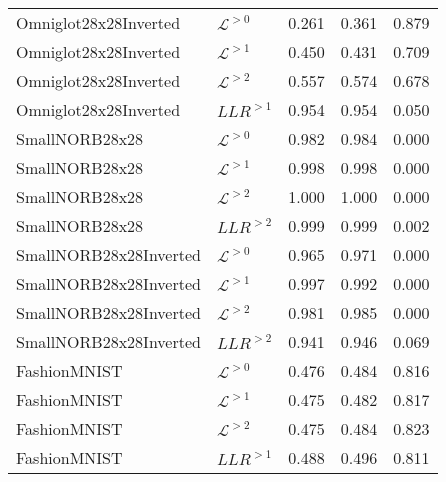 {\begin{table}[t]
\begin{tabular}{llrrr}
\midrule
Omniglot28x28Inverted    &  $\mathcal{L}^{>0}$    &  0.261  &  0.361  &  0.879 \\
Omniglot28x28Inverted    &  $\mathcal{L}^{>1}$    &  0.450  &  0.431  &  0.709 \\
Omniglot28x28Inverted    &  $\mathcal{L}^{>2}$    &  0.557  &  0.574  &  0.678 \\
Omniglot28x28Inverted    &  $LLR^{>1}$            &  0.954  &  0.954  &  0.050 \\
\midrule
SmallNORB28x28           &  $\mathcal{L}^{>0}$    &  0.982  &  0.984  &  0.000 \\
SmallNORB28x28           &  $\mathcal{L}^{>1}$    &  0.998  &  0.998  &  0.000 \\
SmallNORB28x28           &  $\mathcal{L}^{>2}$    &  1.000  &  1.000  &  0.000 \\
SmallNORB28x28           &  $LLR^{>2}$            &  0.999  &  0.999  &  0.002 \\
\midrule
SmallNORB28x28Inverted   &  $\mathcal{L}^{>0}$    &  0.965  &  0.971  &  0.000 \\
SmallNORB28x28Inverted   &  $\mathcal{L}^{>1}$    &  0.997  &  0.992  &  0.000 \\
SmallNORB28x28Inverted   &  $\mathcal{L}^{>2}$    &  0.981  &  0.985  &  0.000 \\
SmallNORB28x28Inverted   &  $LLR^{>2}$            &  0.941  &  0.946  &  0.069 \\
\midrule
FashionMNIST             &  $\mathcal{L}^{>0}$    &  0.476  &  0.484  &  0.816 \\
FashionMNIST             &  $\mathcal{L}^{>1}$    &  0.475  &  0.482  &  0.817 \\
FashionMNIST             &  $\mathcal{L}^{>2}$    &  0.475  &  0.484  &  0.823 \\
FashionMNIST             &  $LLR^{>1}$            &  0.488  &  0.496  &  0.811 \\
         \bottomrule
    \end{tabular}
\end{table}

}
